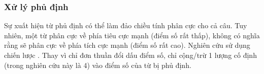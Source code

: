 \subsubsection*{Xử lý phủ định}
Sự xuất hiện từ phủ định có thể làm đảo chiều tính phân cực cho cả câu. Tuy nhiên, một từ phân cực về phía tiêu cực mạnh (điểm số rất thấp), không có nghĩa rằng sẽ phân cực về phía tích cực mạnh (điểm số rất cao). Nghiên cứu \cite{taboada2011lexicon} sử dụng chiến lược . Thay vì chỉ đơn thuần đổi dấu điểm số,  chỉ cộng/trừ 1 lượng cố định (trong nghiên cứu này là 4) vào điểm số của từ bị phủ định.\\

